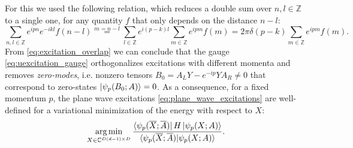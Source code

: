 For this we used the following relation, which reduces a double sum over $n, l \in \mathbb{Z}$ to a single one, for any quantity $f$ that only depends on the distance $n - l$:
\begin{equation} \label{eq:double_sum}
	\sum_{n, l \in \mathbb{Z}} e^{ipn} e^{-ikl} f(n-l) \overset{m=n-l}{=} \sum_{l\in \mathbb{Z}} e^{i(p-k)l} \sum_{m \in \mathbb{Z}}e^{ipm} f(m) = 2 \pi \delta (p-k) \sum_{m \in \mathbb{Z}} e^{ipm} f(m).
\end{equation}
From \eqref{eq:excitation_overlap} we can conclude that the gauge \eqref{eq:uexcitation_gauge} orthogonalizes excitations with different momenta and removes \textit{zero-modes}, i.e. nonzero tensors $B_0 = A_L Y - e^{-ip} Y A_R \neq 0$ that correspond to zero-states $\ket{\psi_p (B_0; A)} = 0$. As a consequence, for a fixed momentum $p$, the plane wave excitations \eqref{eq:plane_wave_excitations} are well-defined for a variational minimization of the energy with respect to $X$:
\begin{equation}
	\operatorname*{arg\,min}_{X \in \mathbb{C}^{D(d-1) \times D}} \frac{\bra{\psi_p(\overline{X}; \overline{A})} H \ket{\psi_p(X; A)}}{\langle \psi_p(\overline{X}; \overline{A}) \vert \psi_p(X; A) \rangle}.
\end{equation}

